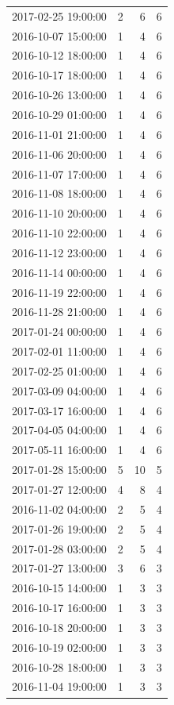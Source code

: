 \begin{tabular}{lrrr}
2017-02-25 19:00:00 & 2 & 6 & 6 \\
2016-10-07 15:00:00 & 1 & 4 & 6 \\
2016-10-12 18:00:00 & 1 & 4 & 6 \\
2016-10-17 18:00:00 & 1 & 4 & 6 \\
2016-10-26 13:00:00 & 1 & 4 & 6 \\
2016-10-29 01:00:00 & 1 & 4 & 6 \\
2016-11-01 21:00:00 & 1 & 4 & 6 \\
2016-11-06 20:00:00 & 1 & 4 & 6 \\
2016-11-07 17:00:00 & 1 & 4 & 6 \\
2016-11-08 18:00:00 & 1 & 4 & 6 \\
2016-11-10 20:00:00 & 1 & 4 & 6 \\
2016-11-10 22:00:00 & 1 & 4 & 6 \\
2016-11-12 23:00:00 & 1 & 4 & 6 \\
2016-11-14 00:00:00 & 1 & 4 & 6 \\
2016-11-19 22:00:00 & 1 & 4 & 6 \\
2016-11-28 21:00:00 & 1 & 4 & 6 \\
2017-01-24 00:00:00 & 1 & 4 & 6 \\
2017-02-01 11:00:00 & 1 & 4 & 6 \\
2017-02-25 01:00:00 & 1 & 4 & 6 \\
2017-03-09 04:00:00 & 1 & 4 & 6 \\
2017-03-17 16:00:00 & 1 & 4 & 6 \\
2017-04-05 04:00:00 & 1 & 4 & 6 \\
2017-05-11 16:00:00 & 1 & 4 & 6 \\
2017-01-28 15:00:00 & 5 & 10 & 5 \\
2017-01-27 12:00:00 & 4 & 8 & 4 \\
2016-11-02 04:00:00 & 2 & 5 & 4 \\
2017-01-26 19:00:00 & 2 & 5 & 4 \\
2017-01-28 03:00:00 & 2 & 5 & 4 \\
2017-01-27 13:00:00 & 3 & 6 & 3 \\
2016-10-15 14:00:00 & 1 & 3 & 3 \\
2016-10-17 16:00:00 & 1 & 3 & 3 \\
2016-10-18 20:00:00 & 1 & 3 & 3 \\
2016-10-19 02:00:00 & 1 & 3 & 3 \\
2016-10-28 18:00:00 & 1 & 3 & 3 \\
2016-11-04 19:00:00 & 1 & 3 & 3 \\

\end{tabular}

